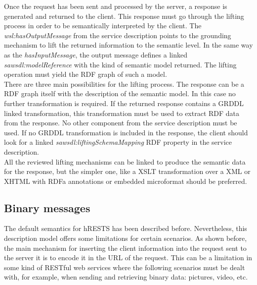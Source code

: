 Once the request has been sent and processed by the server, a response is generated and returned to the client. This response must go through the lifting process in order to be semantically interpreted by the client. The \emph{wsl:hasOutputMessage} from the service description points to the grounding mechanism to lift the returned information to the semantic level. In the same way as the \emph{hasInputMessage}, the output message defines a linked \emph{sawsdl:modelReference} with the kind of semantic model returned. The lifting operation must yield the RDF graph of such a model.\\
 There are three main possibilities for the lifting process.
The response can be a RDF graph itself with the description of the semantic model. In this case no further transformation is required. If the returned response contains a GRDDL linked transformation, this transformation must be used to extract RDF data from the response. No other component from the service description must be used. If no GRDDL transformation is included in the response, the client should look for a linked \emph{sawsdl:liftingSchemaMapping} RDF property in the service description.\\
All the reviewed lifting mechanisms can be linked to produce the semantic data for the response, but the simpler one, like a XSLT transformation over a XML or XHTML with RDFa annotations or embedded microformat should be preferred.\\

\subsection{Binary messages}

The default semantics for hRESTS has been described before. Nevertheless, this description model offers some limitations for certain scenarios. As shown before, the main mechanism for inserting the client information into the request sent to the server it is to encode it in the URL of the request. This can be a limitation in some kind of RESTful web services where the following scenarios must be dealt with, for example, when sending and retrieving binary data: pictures, video, etc.

